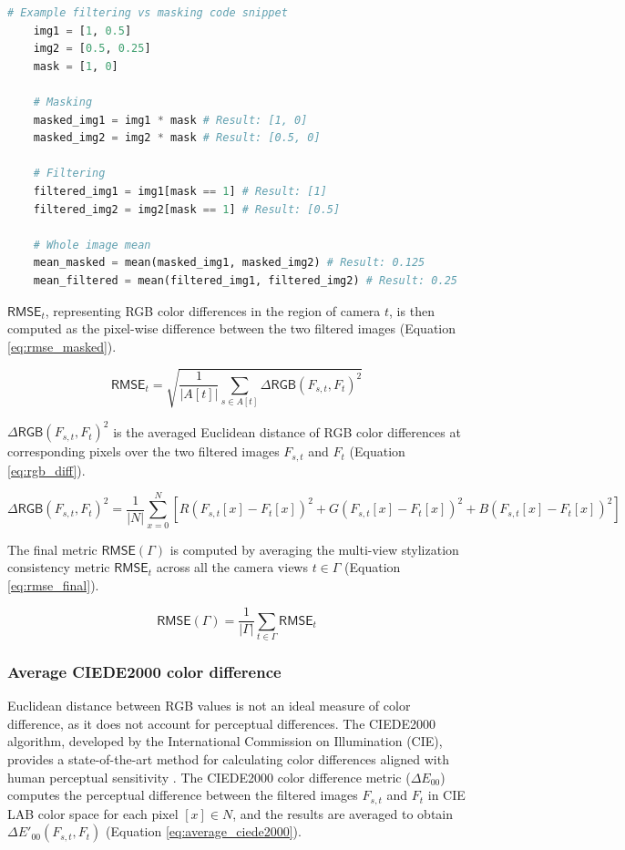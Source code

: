 \begin{lstlisting}[language=Python]
	# Example filtering vs masking code snippet
	img1 = [1, 0.5]
	img2 = [0.5, 0.25]
	mask = [1, 0]

	# Masking
	masked_img1 = img1 * mask # Result: [1, 0]
	masked_img2 = img2 * mask # Result: [0.5, 0]

	# Filtering
	filtered_img1 = img1[mask == 1] # Result: [1]
	filtered_img2 = img2[mask == 1] # Result: [0.5]

	# Whole image mean
	mean_masked = mean(masked_img1, masked_img2) # Result: 0.125
	mean_filtered = mean(filtered_img1, filtered_img2) # Result: 0.25
\end{lstlisting}

$\mathsf{RMSE}_{t}$, representing RGB color differences in the region of camera $t$, is then computed as the pixel-wise difference between the two filtered images (Equation \ref{eq:rmse_masked}).

\begin{equation}
	\label{eq:rmse_masked}
	\mathsf{RMSE}_{t} = \sqrt{\frac{1}{\vert A[t] \vert} \sum_{s \in A[t]} \mathsf{\Delta RGB}(F_{s,t}, F_t)^2}
\end{equation}

$\mathsf{\Delta RGB}(F_{s,t}, F_t)^2$ is the averaged Euclidean distance of RGB color differences at corresponding pixels over the two filtered images $F_{s,t}$ and $F_t$ (Equation \ref{eq:rgb_diff}).

\begin{equation}
	\label{eq:rgb_diff}
	\mathsf{\Delta RGB}(F_{s,t}, F_t)^2  =\frac{1}{\vert N \vert} \sum_{x=0}^N [R(F_{s,t}[x] - F_t[x])^2 + G(F_{s,t}[x] - F_t[x])^2 + B(F_{s,t}[x] - F_t[x])^2]
\end{equation}

The final metric $\mathsf{RMSE}(\varGamma )$ is computed by averaging the multi-view stylization consistency metric $\mathsf{RMSE}_{t}$ across all the camera views $t \in \varGamma $ (Equation \ref{eq:rmse_final}).

\begin{equation}
	\label{eq:rmse_final}
	\mathsf{RMSE}(\varGamma ) = \frac{1}{\vert \varGamma  \vert} \sum_{t \in \varGamma } \mathsf{RMSE}_{t}
\end{equation}

\subsubsection{Average CIEDE2000 color difference}
Euclidean distance between RGB values is not an ideal measure of color difference, as it does not account for perceptual differences. The CIEDE2000 algorithm, developed by the International Commission on Illumination (CIE), provides a state-of-the-art method for calculating color differences aligned with human perceptual sensitivity \citep{Pereira.2020, Sharma.2005}. The CIEDE2000 color difference metric ($\Delta E_{00}$) computes the perceptual difference between the filtered images $F_{s,t}$ and $F_t$ in CIE LAB color space for each pixel $[x] \in N$, and the results are averaged to obtain $\Delta E'_{00}(F_{s,t}, F_t)$ (Equation \ref{eq:average_ciede2000}).

